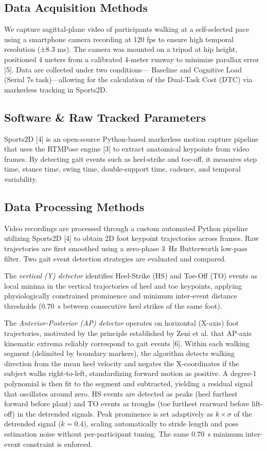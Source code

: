 \documentclass[conference]{IEEEtran}
\begin{document}
\subsection{Data Acquisition Methods}

We capture sagittal-plane video of participants walking at
a self-selected pace using a smartphone camera recording at
120 fps to ensure high temporal resolution (±8.3 ms). The
camera was mounted on a tripod at hip height, positioned
4 meters from a calibrated 4-meter runway to minimize
parallax error [5]. Data are collected under two conditions—
Baseline and Cognitive Load (Serial 7s task)—allowing for
the calculation of the Dual-Task Cost (DTC) via markerless tracking in Sports2D.

\subsection{Software \& Raw Tracked Parameters} 
Sports2D [4] is an open-source Python-based markerless
motion capture pipeline that uses the RTMPose engine [3] to
extract anatomical keypoints from video frames. By detecting
gait events such as heel-strike and toe-off, it measures step
time, stance time, swing time, double-support time, cadence,
and temporal variability.

\subsection{Data Processing Methods}
Video recordings are processed through a custom automated Python pipeline utilizing Sports2D [4] to obtain 2D foot keypoint trajectories across frames. Raw trajectories are first smoothed using a zero-phase 3~Hz Butterworth low-pass filter. Two gait event detection strategies are evaluated and compared.

The \textit{vertical (Y) detector} identifies Heel-Strike (HS) and Toe-Off (TO) events as local minima in the vertical trajectories of heel and toe keypoints, applying physiologically constrained prominence and minimum inter-event distance thresholds (0.70~s between consecutive heel strikes of the same foot).

The \textit{Anterior-Posterior (AP) detector} operates on horizontal (X-axis) foot trajectories, motivated by the principle established by Zeni et al. that AP-axis kinematic extrema reliably correspond to gait events [6]. Within each walking segment (delimited by boundary markers), the algorithm detects walking direction from the mean heel velocity and negates the X-coordinates if the subject walks right-to-left, standardizing forward motion as positive. A degree-1 polynomial is then fit to the segment and subtracted, yielding a residual signal that oscillates around zero. HS events are detected as peaks (heel furthest forward before plant) and TO events as troughs (toe furthest rearward before lift-off) in the detrended signals. Peak prominence is set adaptively as $k \times \sigma$ of the detrended signal ($k = 0.4$), scaling automatically to stride length and pose estimation noise without per-participant tuning. The same 0.70~s minimum inter-event constraint is enforced.
\end{document}
